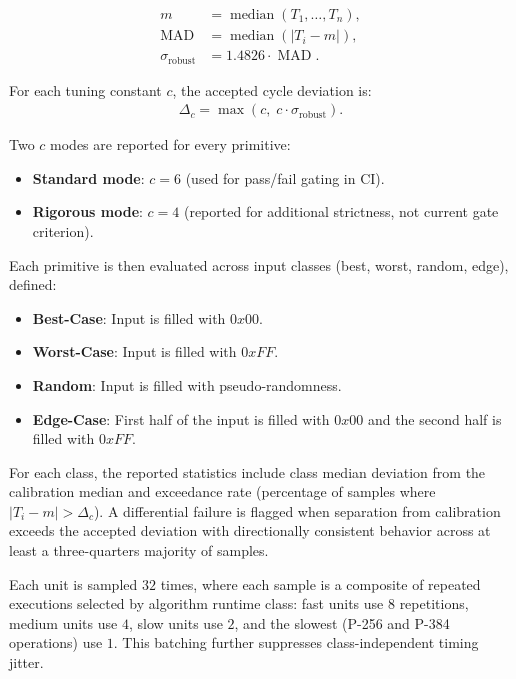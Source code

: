 \documentclass[titlepage]{report}
\begin{document}
	\begin{align*}
		m &= \operatorname{median}(T_1,\dots,T_n),\\
		\operatorname{MAD} &= \operatorname{median}\left(\left|T_i - m\right|\right),\\
		\sigma_{\text{robust}} &= 1.4826 \cdot \operatorname{MAD}.
	\end{align*}
	
	For each tuning constant $c$, the accepted cycle deviation is:
	\begin{align*}
		\Delta_c = \max\!\left(c,\; c\cdot \sigma_{\text{robust}}\right).
	\end{align*}
	
	Two $c$ modes are reported for every primitive:
	\begin{itemize}
		\item \textbf{Standard mode}: $c=6$ (used for pass/fail gating in CI).
		\item \textbf{Rigorous mode}: $c=4$ (reported for additional strictness, not current gate criterion).
	\end{itemize}
	
	Each primitive is then evaluated across input classes (best, worst, random, edge), defined:
	\begin{itemize}
		\item \textbf{Best-Case}: Input is filled with $0x00$.
		\item \textbf{Worst-Case}: Input is filled with $0xFF$.
		\item \textbf{Random}: Input is filled with pseudo-randomness.
		\item \textbf{Edge-Case}: First half of the input is filled with $0x00$ and the second half is filled with $0xFF$.
	\end{itemize}
	
	For each class, the reported statistics include class median deviation from the calibration median and exceedance rate (percentage of samples where $|T_i-m|>\Delta_c$). A differential failure is flagged when separation from calibration exceeds the accepted deviation with directionally consistent behavior across at least a three-quarters majority of samples.	
	
	Each unit is sampled $32$ times, where each sample is a composite of repeated executions selected by algorithm runtime class: fast units use $8$ repetitions, medium units use $4$, slow units use $2$, and the slowest (P-256 and P-384 operations) use $1$. This batching further suppresses class-independent timing jitter.
\end{document}
